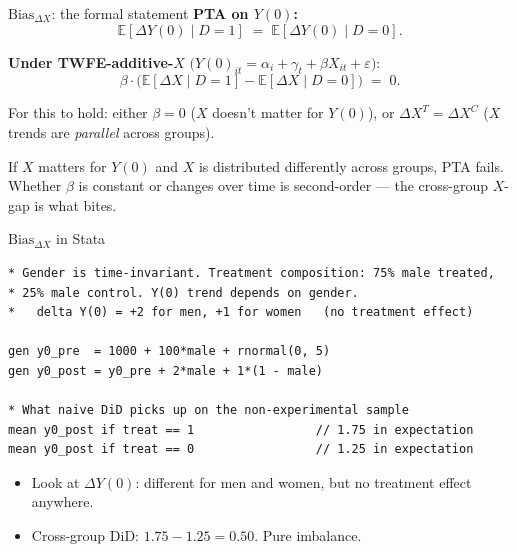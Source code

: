\documentclass[aspectratio=169,11pt]{beamer}
\begin{document}
\begin{frame}{$\text{Bias}_{\Delta X}$: the formal statement}
\footnotesize
\textbf{PTA on $Y(0)$:}
\[
\mathbb{E}[\Delta Y(0) \mid D{=}1] \;=\; \mathbb{E}[\Delta Y(0) \mid D{=}0].
\]

\vspace{0.3em}
\textbf{Under TWFE-additive-$X$} $\big(Y(0)_{it} = \alpha_i + \gamma_t + \beta X_{it} + \varepsilon\big)$:
\[
\beta \cdot \big(\mathbb{E}[\Delta X \mid D{=}1] - \mathbb{E}[\Delta X \mid D{=}0]\big) \;=\; 0.
\]

\vspace{0.3em}
For this to hold: \;either $\beta = 0$ ($X$ doesn't matter for $Y(0)$), or $\Delta X^T = \Delta X^C$ \;($X$ trends are \textit{parallel} across groups).

\vspace{0.5em}
 \;If $X$ matters for $Y(0)$ and $X$ is distributed differently across groups, PTA fails. \;Whether $\beta$ is constant or changes over time is second-order --- the cross-group $X$-gap is what bites.
\end{frame}

\begin{frame}[fragile]{$\text{Bias}_{\Delta X}$ in Stata}
\footnotesize
\begin{lstlisting}[language={[ANSI]C},basicstyle=\ttfamily\scriptsize]
* Gender is time-invariant. Treatment composition: 75% male treated,
* 25% male control. Y(0) trend depends on gender.
*   delta Y(0) = +2 for men, +1 for women   (no treatment effect)

gen y0_pre  = 1000 + 100*male + rnormal(0, 5)
gen y0_post = y0_pre + 2*male + 1*(1 - male)

* What naive DiD picks up on the non-experimental sample
mean y0_post if treat == 1                 // 1.75 in expectation
mean y0_post if treat == 0                 // 1.25 in expectation
\end{lstlisting}

\vspace{0.4em}
\begin{itemize}\setlength\itemsep{2pt}
  \item Look at $\Delta Y(0)$: \;different for men and women, but no treatment effect anywhere.
  \item Cross-group DiD: $1.75 - 1.25 = 0.50$. \;Pure imbalance.
\end{itemize}
\end{frame}
\end{document}
